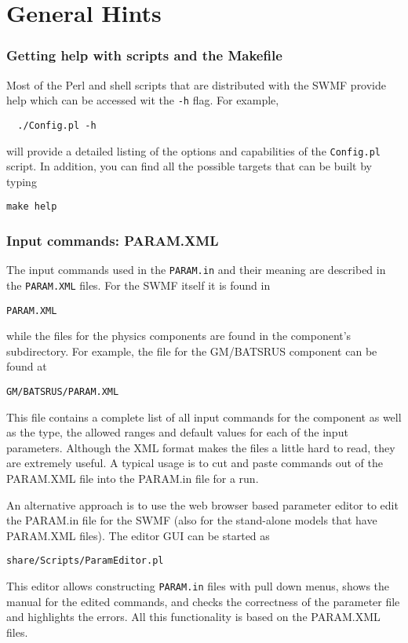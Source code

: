 \section{General Hints}

\subsubsection{Getting help with scripts and the Makefile}

Most of the Perl and shell scripts that are distributed with the SWMF
provide help which can be accessed wit the {\tt -h} flag. For example, 
\begin{verbatim}
  ./Config.pl -h
\end{verbatim}
will provide a detailed listing of the options and capabilities of the
{\tt Config.pl} script.  In addition, you can find all the possible
targets  that can be built by typing
\begin{verbatim}
make help
\end{verbatim}

\subsubsection{Input commands: PARAM.XML}

The input commands used in the {\tt PARAM.in} and their meaning are 
described in the {\tt PARAM.XML} files. For the SWMF itself it is found in
\begin{verbatim}
PARAM.XML
\end{verbatim}
while the files for the physics components are found in the component's
subdirectory.  For example, the file for the GM/BATSRUS component can
be found at
\begin{verbatim}
GM/BATSRUS/PARAM.XML
\end{verbatim}
This file contains a complete list of all input commands for the
component as well as the type, the allowed ranges and default values
for each of the input parameters.
Although the XML format makes the files a little hard to read, they are
extremely useful.  A typical usage is to cut and paste commands out of the
PARAM.XML file into the PARAM.in file for a run. 

An alternative approach is to use the web browser based parameter editor 
to edit the PARAM.in file for the SWMF 
(also for the stand-alone models that have PARAM.XML files).
The editor GUI can be started as
\begin{verbatim}
share/Scripts/ParamEditor.pl
\end{verbatim}
This editor allows constructing {\tt PARAM.in} files with pull down menus, 
shows the manual for the edited commands, and checks the correctness of
the parameter file and highlights the errors. All this functionality 
is based on the PARAM.XML files.

